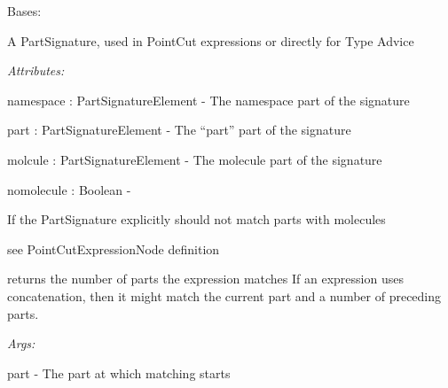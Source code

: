 \documentclass[letterpaper,10pt,english]{sphinxmanual}
\begin{document}
\begin{fulllineitems}
\label{modules/index:aosb.core.PartSignature}
Bases: {\hyperref[modules/index:aosb.core.PointCutExpressionNode]{}}

A PartSignature, used in PointCut expressions or directly for Type Advice

\begin{DUlineblock}{0em}
\item[] \emph{Attributes:}
\item[]
\begin{DUlineblock}{\DUlineblockindent}
\item[] namespace : PartSignatureElement - The namespace part of the signature
\item[] part : PartSignatureElement - The ``part'' part of the signature
\item[] molcule : PartSignatureElement - The molecule part of the signature
\item[] nomolecule : Boolean - 
\item[]
\begin{DUlineblock}{\DUlineblockindent}
\item[] If the PartSignature explicitly should not match parts with molecules
\end{DUlineblock}
\end{DUlineblock}
\end{DUlineblock}

\begin{fulllineitems}
\label{modules/index:aosb.core.PartSignature.match}
see PointCutExpressionNode definition

\end{fulllineitems}


\begin{fulllineitems}
\label{modules/index:aosb.core.PartSignature.numberOfMatchingParts}
returns the number of parts the expression matches
\textbar{} If an expression uses concatenation, then it might match the current part and a number of preceding parts.

\begin{DUlineblock}{0em}
\item[] \emph{Args:}
\item[]
\begin{DUlineblock}{\DUlineblockindent}
\item[] part - The part at which matching starts
\end{DUlineblock}
\end{DUlineblock}


\end{fulllineitems}
\end{fulllineitems}
\end{document}
